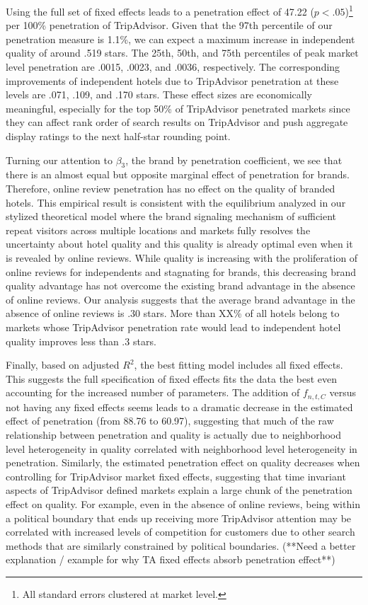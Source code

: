 \documentclass[mksc,blindrev]{informs3} %
\begin{document}
Using the full set of fixed effects leads to a penetration effect of 47.22 ($p<.05$)\footnote{All standard errors clustered at market level.} per 100\% penetration of TripAdvisor. Given that the 97th percentile of our penetration measure is 1.1\%, we can expect a maximum increase in independent quality of around .519 stars. The 25th, 50th, and 75th percentiles of peak market level penetration are .0015, .0023, and .0036, respectively. The corresponding improvements of independent hotels due to TripAdvisor penetration at these levels are .071, .109, and .170 stars. These effect sizes are economically meaningful, especially for the top 50\% of TripAdvisor penetrated markets since they can affect rank order of search results on TripAdvisor and push aggregate display ratings to the next half-star rounding point.

Turning our attention to $\beta_3$, the brand by penetration coefficient, we see that there is an almost equal but opposite marginal effect of penetration for brands. Therefore, online review penetration has no effect on the quality of branded hotels. This empirical result is consistent with the equilibrium analyzed in our stylized theoretical model where the brand signaling mechanism of sufficient repeat visitors across multiple locations and markets fully resolves the uncertainty about hotel quality and this quality is already optimal even when it is revealed by online reviews. While quality is increasing with the proliferation of online reviews for independents and stagnating for brands, this decreasing brand quality advantage has not overcome the existing brand advantage in the absence of online reviews. Our analysis suggests that the average brand advantage in the absence of online reviews is $.30$ stars. More than XX\% of all hotels belong to markets whose TripAdvisor penetration rate would lead to independent hotel quality improves less than .3 stars. 

Finally, based on adjusted $R^2$, the best fitting model includes all fixed effects. This suggests the full specification of fixed effects fits the data the best even accounting for the increased number of parameters. The addition of $f_{n,t,C}$ versus not having any fixed effects seems leads to a dramatic decrease in the estimated effect of penetration (from 88.76 to 60.97), suggesting that much of the raw relationship between penetration and quality is actually due to neighborhood level heterogeneity in quality correlated with neighborhood level heterogeneity in penetration. Similarly, the estimated penetration effect on quality decreases when controlling for TripAdvisor market fixed effects, suggesting that time invariant aspects of TripAdvisor defined markets explain a large chunk of the penetration effect on quality. For example, even in the absence of online reviews, being within a political boundary that ends up receiving more TripAdvisor attention may be correlated with increased levels of competition for customers due to other search methods that are similarly constrained by political boundaries. (**Need a better explanation / example for why TA fixed effects absorb penetration effect**)
\end{document}
